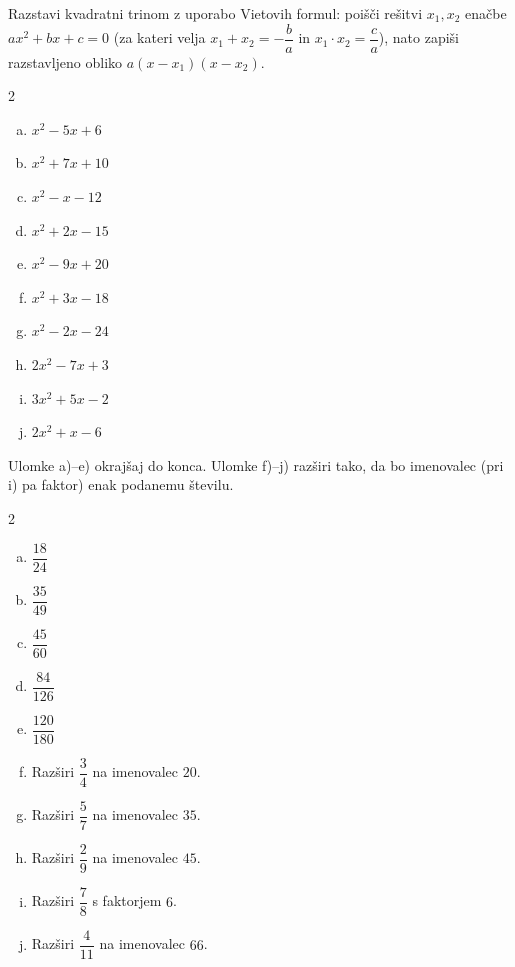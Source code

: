 \documentclass[a4paper,12pt]{letter}
\begin{document}
\begin{naloga}
Razstavi kvadratni trinom z uporabo Vietovih formul: poi\v{s}\v{c}i re\v{s}itvi $x_1,x_2$ ena\v{c}be
$ax^2+bx+c=0$ (za kateri velja $x_1+x_2=-\dfrac{b}{a}$ in $x_1\cdot x_2=\dfrac{c}{a}$),
nato zapi\v{s}i razstavljeno obliko $a(x-x_1)(x-x_2)$.

\begin{multicols}{2}
\begin{enumerate}[a.)]
\item $x^2-5x+6$
\item $x^2+7x+10$
\item $x^2-x-12$
\item $x^2+2x-15$
\item $x^2-9x+20$
\item $x^2+3x-18$
\item $x^2-2x-24$
\item $2x^2-7x+3$
\item $3x^2+5x-2$
\item $2x^2+x-6$
\end{enumerate}
\end{multicols}
\end{naloga}

\begin{naloga}
Ulomke a)--e) okraj\v{s}aj do konca. Ulomke f)--j) raz\v{s}iri tako, da bo imenovalec
(pri i) pa faktor) enak podanemu \v{s}tevilu.

\begin{multicols}{2}
\begin{enumerate}[a.)]
\item $\dfrac{18}{24}$
\item $\dfrac{35}{49}$
\item $\dfrac{45}{60}$
\item $\dfrac{84}{126}$
\item $\dfrac{120}{180}$
\item Raz\v{s}iri $\dfrac{3}{4}$ na imenovalec $20$.
\item Raz\v{s}iri $\dfrac{5}{7}$ na imenovalec $35$.
\item Raz\v{s}iri $\dfrac{2}{9}$ na imenovalec $45$.
\item Raz\v{s}iri $\dfrac{7}{8}$ s faktorjem $6$.
\item Raz\v{s}iri $\dfrac{4}{11}$ na imenovalec $66$.
\end{enumerate}
\end{multicols}
\end{naloga}
\end{document}

